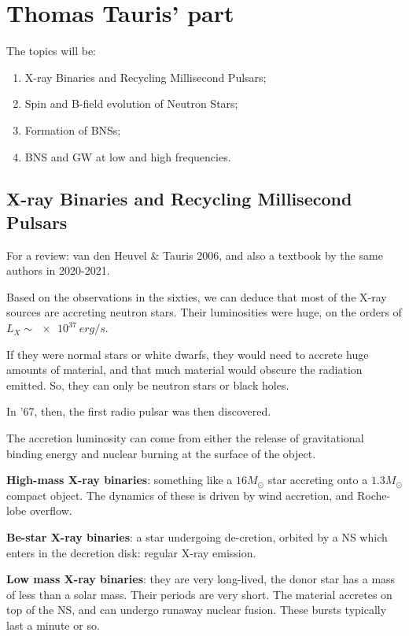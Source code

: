 \documentclass[main.tex]{subfiles}
\begin{document}
\chapter{Thomas Tauris' part}


The topics will be:
\begin{enumerate}
  \item X-ray Binaries and Recycling Millisecond Pulsars;
  \item Spin and B-field evolution of Neutron Stars;
  \item Formation of BNSs;
  \item BNS and GW at low and high frequencies.
\end{enumerate}

\section{X-ray Binaries and Recycling Millisecond Pulsars}

For a review: van den Heuvel \& Tauris 2006, and also a textbook by the same authors in 2020-2021. 

Based on the observations in the sixties, we can deduce that most of the X-ray sources are accreting neutron stars. 
Their luminosities were huge, on the orders of \(L_X \sim \SI{e37}{erg /s }\). 

If they were normal stars or white dwarfs, they would need to accrete huge amounts of material, and that much material would obscure the radiation emitted. 
So, they can only be neutron stars or black holes. 

In '67, then, the first radio pulsar was then discovered. 

The accretion luminosity can come from either the release of gravitational binding energy and nuclear burning at the surface of the object. 

\textbf{High-mass X-ray binaries}: something like a \(16 M_{\odot}\) star accreting onto a \(1.3 M_{\odot}\) compact object. 
The dynamics of these is driven by wind accretion, and Roche-lobe overflow. 

\textbf{Be-star X-ray binaries}: a star undergoing de-cretion, orbited by a NS which enters in the decretion disk: regular X-ray emission. 

\textbf{Low mass X-ray binaries}: they are very long-lived, the donor star has a mass of less than a solar mass. Their periods are very short. 
The material accretes on top of the NS, and can undergo runaway nuclear fusion. These bursts typically last a minute or so. 
\end{document}
